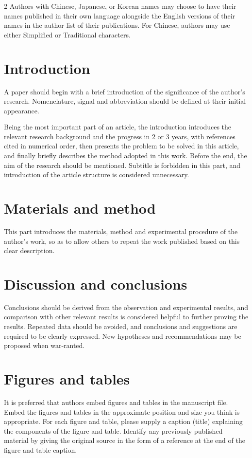 \documentclass[fleqn]{2026SCGE}
\begin{document}
\begin{multicols}{2}
Authors with Chinese, Japanese, or Korean names may choose to have their names published in their own language alongside the English versions of their names in the author list of their publications. For Chinese, authors may use either Simplified or Traditional characters.
\section{Introduction}\label{sec:3}
A paper should begin with a brief introduction of the significance of the author's research. Nomenclature, signal and abbreviation should be defined at their initial appearance.

Being the most important part of an article, the introduction introduces the relevant research background and the progress in 2 or 3 years, with references cited in numerical order, then presents the problem to be solved in this article, and finally briefly describes the method adopted in this work. Before the end, the aim of the research should be mentioned. Subtitle is forbidden in this part, and introduction of the article structure is considered unnecessary.
\section{Materials and method}\label{sec:4}
This part introduces the materials, method and experimental procedure of the author's work, so as to allow others to repeat the work published based on this clear description.
\section{Discussion and conclusions}\label{sec:5}
Conclusions should be derived from the observation and experimental results, and comparison with other relevant results is considered helpful to further proving the results. Repeated data should be avoided, and conclusions and suggestions are required to be clearly expressed. New hypotheses and recommendations may be proposed when war-ranted.
\section{Figures and tables}\label{sec:6}
It is preferred that authors embed figures and tables in the manuscript file. Embed the figures and tables in the approximate position and size you think is appropriate. For each figure and table, please supply a caption (title) explaining the components of the figure and table. Identify any previously published material by giving the original source in the form of a reference at the end of the figure and table caption.



\end{multicols}
\end{document}

